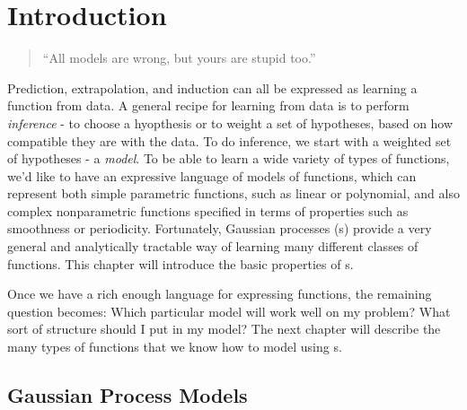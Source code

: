 
\inbpdocument

\chapter{Introduction}
\label{ch:intro}




\begin{quotation}
``All models are wrong, but yours are stupid too.'' \\
\hspace*{\fill} \citet{mlhipster}
\end{quotation}

Prediction, extrapolation, and induction can all be expressed as learning a function from data.
A general recipe for learning from data is to perform \emph{inference} - to choose a hyopthesis or to weight a set of hypotheses, based on how compatible they are with the data.
To do inference, we start with a weighted set of hypotheses - a \emph{model}.
To be able to learn a wide variety of types of functions, we'd like to have an expressive language of models of functions, which can represent both simple parametric functions, such as linear or polynomial, and also complex nonparametric functions specified in terms of properties such as smoothness or periodicity.
Fortunately, Gaussian processes (\gp{}s) provide a very general and analytically tractable way of learning many different classes of functions.
This chapter will introduce the basic properties of \gp{}s.

Once we have a rich enough language for expressing functions, the remaining question becomes:
Which particular model will work well on my problem?
What sort of structure should I put in my model?
The next chapter will describe the many types of functions that we know how to model using \gp{}s.




\section{Gaussian Process Models}

